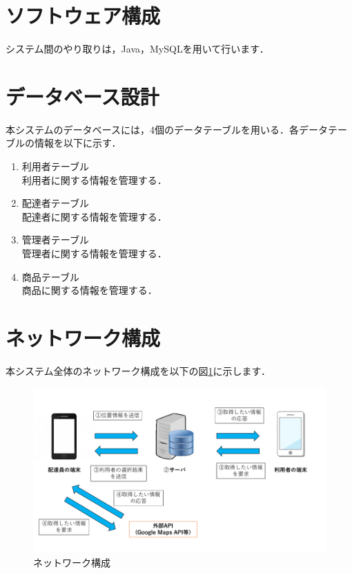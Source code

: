 \documentclass[a4j,titlepage]{jarticle}
\begin{document}
\section{ソフトウェア構成}
システム間のやり取りは，Java，MySQLを用いて行います．

\section{データベース設計}
本システムのデータベースには，4個のデータテーブルを用いる．各データテーブルの情報を以下に示す．

\begin{enumerate}
\item 利用者テーブル\\
  利用者に関する情報を管理する．
\item 配達者テーブル\\
  配達者に関する情報を管理する．
\item 管理者テーブル\\
  管理者に関する情報を管理する．
\item 商品テーブル\\
  商品に関する情報を管理する．
\end{enumerate}

\section{ネットワーク構成}
本システム全体のネットワーク構成を以下の図\ref{fig:i_f}に示します．

\begin{figure}[htbp]
 \begin{center}
  \includegraphics[width=140mm]{information_flow.pdf}
	\caption{ネットワーク構成}
	\label{fig:i_f}
 \end{center}

\end{figure}
\end{document}

